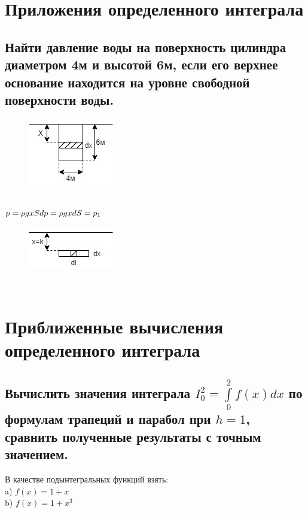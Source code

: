 \documentclass{article}
\begin{document}
\section{Приложения определенного интеграла}
\normalsize
\subsection{Найти давление воды на поверхность цилиндра диаметром 4м и высотой 6м, если его верхнее основание находится на уровне свободной поверхности воды.}
\begin{figure}[h!]
\includegraphics[scale=1]{31}
\end{figure}\\
$ p = \rho gxS \\ dp = \rho gxdS = p_1 $\\
\begin{figure}[h!]
\includegraphics[scale=1]{33}
\end{figure}\\
\newpage
\Large
\section{Приближенные вычисления определенного интеграла}
\normalsize
\subsection{Вычислить значения интеграла $ I^2_0 = \int\limits^2_0 f(x)dx $ по формулам трапеций и парабол при $ h = 1 $, сравнить полученные результаты с точным значением.}
В качестве подынтегральных функций взять:\\
a) $ f(x) = 1 + x $\\
b) $ f(x) = 1 + x^3 $\\
\end{document}
